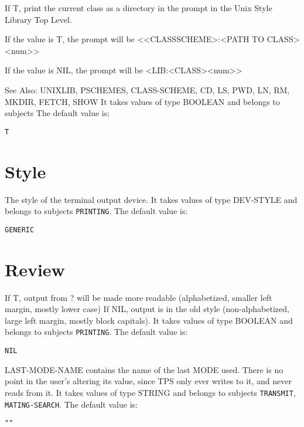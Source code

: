 \begin{description}
\item[UNIXLIB-SHOWPATH]  
If T, print the current class as a directory in the prompt
in the Unix Style Library Top Level.

If the value is T, the prompt will be
<<CLASSSCHEME>:<PATH TO CLASS><num>>

If the value is NIL, the prompt will be
<LIB:<CLASS><num>>

See Also: UNIXLIB, PSCHEMES, CLASS-SCHEME, CD, LS, PWD, LN, RM,
MKDIR, FETCH, SHOW
It takes values of type BOOLEAN and belongs to subjects The default value is: \begin{lstlisting}
T
\end{lstlisting}

\item
\end{description}

\section{Style}

\begin{description} 
\item[STYLE]  
The style of the terminal output device.
It takes values of type DEV-STYLE and belongs to subjects \texttt{PRINTING}.  The default value is: \begin{lstlisting}
GENERIC
\end{lstlisting}

\item
\end{description}

\section{Review}

\begin{description} 
\item[ALPHA-LOWER-FLAG]  
If T, output from ? will be made more readable
(alphabetized, smaller left margin, mostly lower case)
If NIL, output is in the old style (non-alphabetized,
large left margin, mostly block capitals).
It takes values of type BOOLEAN and belongs to subjects \texttt{PRINTING}.  The default value is: \begin{lstlisting}
NIL
\end{lstlisting}

\item[LAST-MODE-NAME]  
LAST-MODE-NAME contains the name of the last MODE used. There
is no point in the user's altering its value, since TPS only ever 
writes to it, and never reads from it.
It takes values of type STRING and belongs to subjects \texttt{TRANSMIT}, \texttt{MATING-SEARCH}.  The default value is: \begin{lstlisting}
""
\end{lstlisting}

\item
\end{description}

